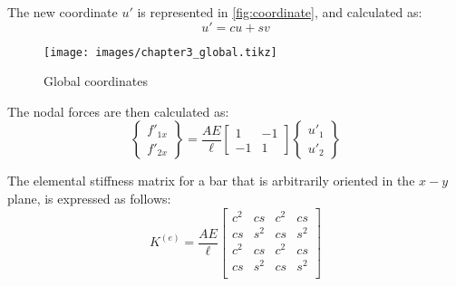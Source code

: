 
The new coordinate $u'$ is represented in \autoref{fig:coordinate}, and calculated as:
%
\begin{equation}
    u' = cu + sv
\end{equation}

\begin{figure}[H]
    \caption{Global coordinates}
    \label{fig:coordinate}
    \centering
    \vspace{1em}
    \texttt{[image: images/chapter3\_global.tikz]}
\end{figure}

The nodal forces are then calculated as:
%
\begin{equation}
    \begin{Bmatrix} f'_{1x} \\ f'_{2x} \end{Bmatrix} = \dfrac{AE}{\ell} \begin{bmatrix} 1 & -1 \\ -1 & 1 \end{bmatrix} \begin{Bmatrix} u'_1 \\ u'_2 \end{Bmatrix}
\end{equation}

The elemental stiffness matrix for a bar that is arbitrarily oriented in the $x-y$ plane, is expressed as follows:
%
\begin{equation}
    K^{(e)} = \dfrac{AE}{\ell} \begin{bmatrix} c^2 & cs & c^2 & cs \\ cs & s^2 & cs & s^2 \\ c^2 & cs & c^2 & cs \\ cs & s^2 & cs & s^2\\ \end{bmatrix}
\end{equation}


